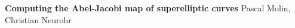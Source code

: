 \documentclass[11pt,a4paper]{article}
\begin{document}
\tableofcontents
\newpage

\begin{center}
  {\bf \huge Computing the Abel-Jacobi map of superelliptic curves} \abstandl
  Pascal Molin, Christian Neurohr
\end{center}
\newpage

















\end{document}
